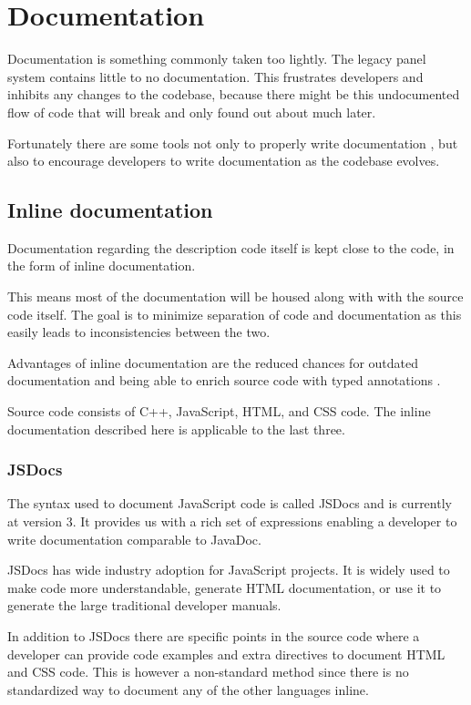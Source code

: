 \chapter{Documentation}
Documentation is something commonly taken too lightly. The legacy panel system
contains little to no documentation.
This frustrates developers and inhibits any changes to the codebase, because
there might be this undocumented flow of code that will break and only found out
about much later.

Fortunately there are some tools not only to properly write documentation
, but also to encourage developers to write documentation as the codebase
evolves.

\section{Inline documentation}
Documentation regarding the description code itself is kept close to the code,
in the form of inline documentation.

This means most of the documentation will be housed along with with the source
code itself. The goal is to minimize separation of code and documentation as
this easily leads to inconsistencies between the two.

Advantages of inline documentation are the reduced chances for outdated
documentation and being able to enrich source code with typed annotations
\cite{JS_Annotations}.

Source code consists of C++, JavaScript, HTML, and CSS code. The inline
documentation described here is applicable to the last three.

\subsection{JSDocs}
The syntax used to document JavaScript code is called JSDocs and is currently
at version 3\cite{JS_Annotations}\cite{JSDoc}. It provides us with a rich set of expressions
enabling a developer to write documentation comparable to JavaDoc.

JSDocs has wide industry adoption for JavaScript projects. It is widely used to
make code more understandable, generate HTML documentation, or use it to generate
the large traditional developer manuals.

In addition to JSDocs there are specific points in the source code where a developer can
provide code examples and extra directives to document HTML and CSS code. This
is however a non-standard method since there is no standardized way to document
any of the other languages inline.

